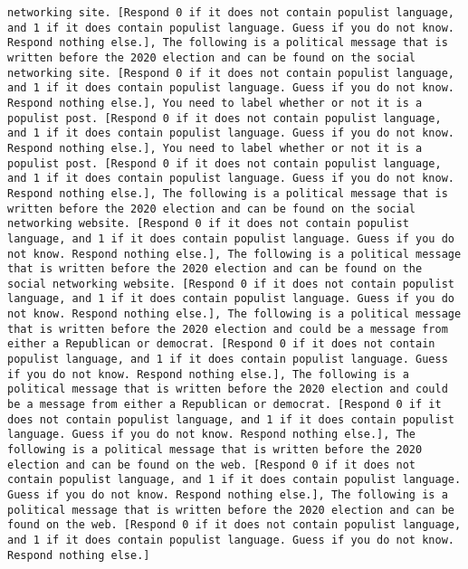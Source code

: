\begin{lstlisting}[label=lst:poor_performing_prompts]
networking site. [Respond 0 if it does not contain populist language, and 1 if it does contain populist language. Guess if you do not know. Respond nothing else.], The following is a political message that is written before the 2020 election and can be found on the social networking site. [Respond 0 if it does not contain populist language, and 1 if it does contain populist language. Guess if you do not know. Respond nothing else.], You need to label whether or not it is a populist post. [Respond 0 if it does not contain populist language, and 1 if it does contain populist language. Guess if you do not know. Respond nothing else.], You need to label whether or not it is a populist post. [Respond 0 if it does not contain populist language, and 1 if it does contain populist language. Guess if you do not know. Respond nothing else.], The following is a political message that is written before the 2020 election and can be found on the social networking website. [Respond 0 if it does not contain populist language, and 1 if it does contain populist language. Guess if you do not know. Respond nothing else.], The following is a political message that is written before the 2020 election and can be found on the social networking website. [Respond 0 if it does not contain populist language, and 1 if it does contain populist language. Guess if you do not know. Respond nothing else.], The following is a political message that is written before the 2020 election and could be a message from either a Republican or democrat. [Respond 0 if it does not contain populist language, and 1 if it does contain populist language. Guess if you do not know. Respond nothing else.], The following is a political message that is written before the 2020 election and could be a message from either a Republican or democrat. [Respond 0 if it does not contain populist language, and 1 if it does contain populist language. Guess if you do not know. Respond nothing else.], The following is a political message that is written before the 2020 election and can be found on the web. [Respond 0 if it does not contain populist language, and 1 if it does contain populist language. Guess if you do not know. Respond nothing else.], The following is a political message that is written before the 2020 election and can be found on the web. [Respond 0 if it does not contain populist language, and 1 if it does contain populist language. Guess if you do not know. Respond nothing else.]

\end{lstlisting}
